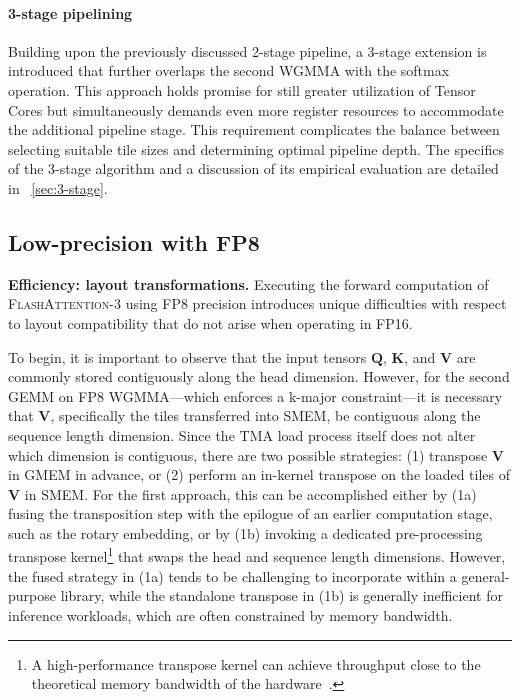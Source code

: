 \begin{enumerate}
\paragraph{3-stage pipelining} Building upon the previously discussed 2-stage pipeline, a 3-stage extension is introduced that further overlaps the second WGMMA with the softmax operation. This approach holds promise for still greater utilization of Tensor Cores but simultaneously demands even more register resources to accommodate the additional pipeline stage. This requirement complicates the balance between selecting suitable tile sizes and determining optimal pipeline depth. The specifics of the 3-stage algorithm and a discussion of its empirical evaluation are detailed in ~\cref{sec:3-stage}.

\subsection{Low-precision with FP8}
\label{sec:algofp8}

\textbf{Efficiency: layout transformations.} Executing the forward computation of \textsc{FlashAttention-3} using FP8 precision introduces unique difficulties with respect to layout compatibility that do not arise when operating in FP16.

To begin, it is important to observe that the input tensors $\mathbf{Q}$, $\mathbf{K}$, and $\mathbf{V}$ are commonly stored contiguously along the head dimension. However, for the second GEMM on FP8 WGMMA—which enforces a k-major constraint—it is necessary that $\mathbf{V}$, specifically the tiles transferred into SMEM, be contiguous along the sequence length dimension. Since the TMA load process itself does not alter which dimension is contiguous, there are two possible strategies: (1) transpose $\mathbf{V}$ in GMEM in advance, or (2) perform an in-kernel transpose on the loaded tiles of $\mathbf{V}$ in SMEM. For the first approach, this can be accomplished either by (1a) fusing the transposition step with the epilogue of an earlier computation stage, such as the rotary embedding, or by (1b) invoking a dedicated pre-processing transpose kernel\footnote{A high-performance transpose kernel can achieve throughput close to the theoretical memory bandwidth of the hardware~\citep{colfax_cutlass_transpose_2024}.} that swaps the head and sequence length dimensions. However, the fused strategy in (1a) tends to be challenging to incorporate within a general-purpose library, while the standalone transpose in (1b) is generally inefficient for inference workloads, which are often constrained by memory bandwidth.


\end{enumerate}
